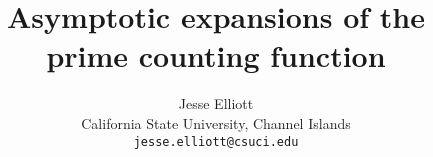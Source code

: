 \documentclass[12pt]{article}
\begin{document}
\newtheorem{theorem}{Theorem}[section]
\newtheorem{proposition}[theorem]{Proposition}
\newtheorem{corollary}[theorem]{Corollary}
\newtheorem{conjecture}[theorem]{Conjecture}
\newtheorem{speculation}[theorem]{Speculation}
\newtheorem{remark}[theorem]{Remark}
\newtheorem{lemma}[theorem]{Lemma}
\newtheorem{example}[theorem]{Example}
\newtheorem{problem}[theorem]{Problem}

 \newenvironment{map}[1]
   {$$#1:\begin{array}{rcl}}
   {\end{array}$$
   \\[-0.5\baselineskip]
 }

 \newenvironment{map*}
   {\[\begin{array}{rcl}}
   {\end{array}\]
   \\[-0.5\baselineskip]
 }


 \newenvironment{nmap*}
   {\begin{eqnarray}\begin{array}{rcl}}
   {\end{array}\end{eqnarray}
   \\[-0.5\baselineskip]
 }

 \newenvironment{nmap}[1]
   {\begin{eqnarray}#1:\begin{array}{rcl}}
   {\end{array}\end{eqnarray}
   \\[-0.5\baselineskip]
 }

\newcommand{\eq}{eq.\@\xspace}
\newcommand{\eqs}{eqs.\@\xspace}
\newcommand{\diagram}{diag.\@\xspace}





\title{Asymptotic expansions of the prime counting function}


\author{Jesse Elliott \\  
California State University, Channel Islands \\
{\tt jesse.elliott@csuci.edu}}

\maketitle
\end{document}
